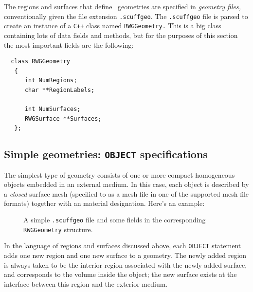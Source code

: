 \documentclass[letterpaper]{article}
\begin{document}
The regions and surfaces that define \lss\, geometries are 
specified in \textit{geometry files,} conventionally given the 
file extension \texttt{.scuffgeo}. The \texttt{.scuffgeo}
file is parsed to create an instance of a \texttt{C++} 
class named \texttt{RWGGeometry.} This is a big class 
containing lots of data fields and methods, but 
for the purposes of this section the most important 
fields are the following:
%
\begin{verbatim}
  class RWGGeometry
   {
      int NumRegions;
      char **RegionLabels;

      int NumSurfaces;
      RWGSurface **Surfaces;
   };
\end{verbatim}
%
\subsection*{Simple geometries: \texttt{OBJECT} specifications}

The simplest type of \lss geometry consists of one or more
compact homogeneous objects embedded in an external 
medium. In this case, each object is described by a 
\textit{closed} surface mesh (specified to \lss
as a mesh file in one of the supported mesh file 
formats) together with an material designation.
Here's an example:
\begin{figure}[H]
\begin{center}
\caption{A simple \texttt{.scuffgeo} file and some fields in the 
         corresponding \texttt{RWGGeometry} structure.}
\end{center}
\end{figure}

In the language of regions and surfaces discussed above,
each \texttt{OBJECT} statement adds one new region and 
one new surface to a geometry. The newly added region 
is always taken to be the interior region associated
with the newly added surface, and corresponds to the
volume inside the object; the new surface exists at 
the interface between this region and the exterior
medium.
\end{document}
